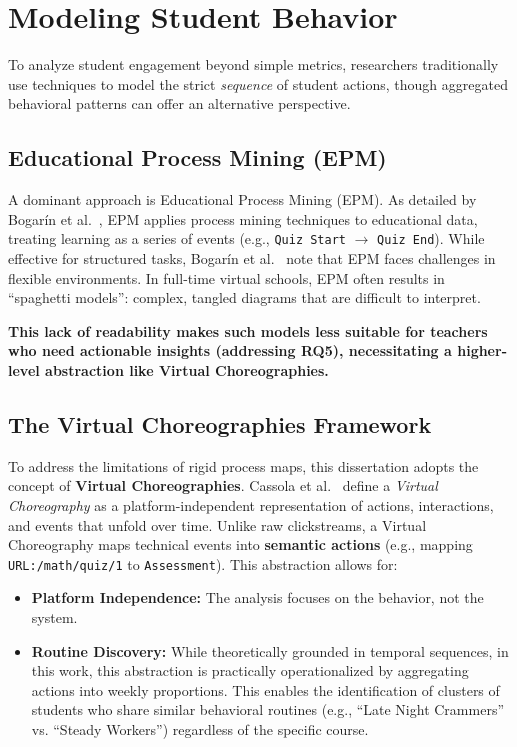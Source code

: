 \section{Modeling Student Behavior}
\label{sec:modeling}
To analyze student engagement beyond simple metrics, researchers traditionally use techniques to model the strict \emph{sequence} of student actions, though aggregated behavioral patterns can offer an alternative perspective.

\subsection{Educational Process Mining (EPM)}
A dominant approach is Educational Process Mining (EPM). As detailed by Bogarín et al.~\cite{bogarin_survey_2018}, EPM applies process mining techniques to educational data, treating learning as a series of events (e.g., \texttt{Quiz Start} $\rightarrow$ \texttt{Quiz End}).
While effective for structured tasks, Bogarín et al.~\cite{bogarin_survey_2018} note that EPM faces challenges in flexible environments.
In full-time virtual schools, EPM often results in ``spaghetti models'': complex, tangled diagrams that are difficult to interpret. 

\textbf{This lack of readability makes such models less suitable for teachers who need actionable insights (addressing RQ5), necessitating a higher-level abstraction like Virtual Choreographies.}

\subsection{The Virtual Choreographies Framework}
To address the limitations of rigid process maps, this dissertation adopts the concept of \textbf{Virtual Choreographies}.
Cassola et al.~\cite{cassola_using_2022} define a \emph{Virtual Choreography} as a platform-independent representation of actions, interactions, and events that unfold over time.
Unlike raw clickstreams, a Virtual Choreography maps technical events into \textbf{semantic actions} (e.g., mapping \texttt{URL:/math/quiz/1} to \texttt{Assessment}).
This abstraction allows for:
\begin{itemize}
    \item \textbf{Platform Independence:} The analysis focuses on the behavior, not the system.
    \item \textbf{Routine Discovery:} While theoretically grounded in temporal sequences, in this work, this abstraction is practically operationalized by aggregating actions into weekly proportions. This enables the identification of clusters of students who share similar behavioral routines (e.g., ``Late Night Crammers'' vs. ``Steady Workers'') regardless of the specific course.
\end{itemize}

